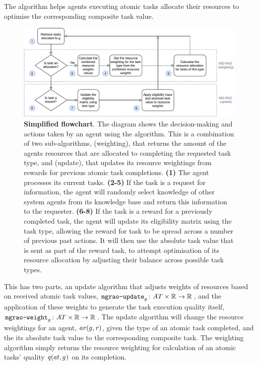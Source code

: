The \acronymMGRAO{}{} algorithm helps agents executing atomic tasks allocate their resources to optimise the corresponding composite task value. 
\begin{figure}[ht]
	\centering
	\includegraphics[width=0.8\linewidth, trim={55pt 0pt 55pt 0pt, clip}]{mgrao-simplified}
	\caption{\textbf{Simplified \acronymMGRAO{}{} flowchart}. The diagram shows the decision-making and actions taken by an agent using the \acronymMGRAO{}{}  algorithm. This is a combination of two sub-algorithms, \acronymMGRAO{}{}(weighting), that returns the amount of the agents resources that are allocated to completing the requested task type, and  \acronymMGRAO{}{}(update), that updates its resource weightings from rewards for previous atomic task completions. \newline
		\textbf{(1)} The agent processes its current tasks. \newline
		\textbf{(2-5)} If the task is a request for information, the agent will randomly select knowledge of other system agents from its knowledge base and return this information to the requester. \newline
		\textbf{(6-8)} If the task is a reward for a previously completed task, the agent will update its eligibility matrix using the task type, allowing the reward for task to be spread across a number of previous past actions. It will then use the absolute task value that is sent as part of the reward task, to attempt optimisation of its resource allocation by adjusting their balance across possible task types.  \newline
	}
	\label{fig:mgrao-simplified}
\end{figure}

This has two parts, an update algorithm that adjusts weights of resources based on received atomic task values, $\label{eq:mgrao_update}\formalMGRAOUpdate{}{}$,  and the application of these weights to generate the task execution quality itself, $\label{eq:mgrao_weighting}\formalMGRAOWeighting{}{}$. The update algorithm will change the resource weightings for an agent, $\functionAgentResources{}{}$, given the type of an atomic task completed, and the its absolute task value to the corresponding composite task. The weighting algorithm simply returns the resource weighting for calculation of an atomic tasks' quality $\functionAtomicTaskQualitySignature{}{}$ on its completion.